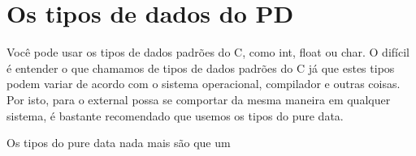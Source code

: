 
\chapter{Os tipos de dados do PD}

Você pode usar os tipos de dados padrões do C, como int, float ou char. O
difícil é entender o que chamamos de tipos de dados padrões do C já que estes
tipos podem variar de acordo com o sistema operacional, compilador e outras
coisas. Por isto, para o external possa se comportar da mesma maneira em
qualquer sistema, é bastante recomendado que usemos os tipos do pure data.

Os tipos do pure data nada mais são que um

